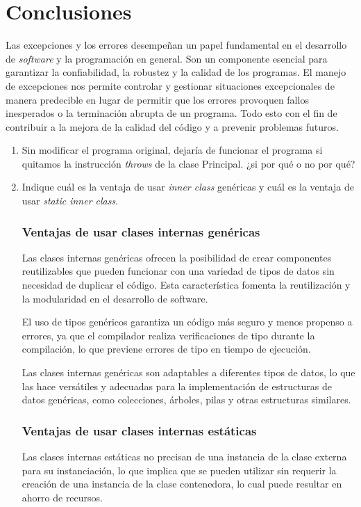 \documentclass[11pt, twocolumn]{article}
\begin{document}
  \section*{Conclusiones}
  Las excepciones y los errores desempeñan un papel fundamental en el desarrollo de \textit{software} y la programación en general. Son un componente esencial para garantizar la confiabilidad, la robustez y la calidad de los programas. El manejo de excepciones nos permite controlar y gestionar situaciones excepcionales de manera predecible en lugar de permitir que los errores provoquen fallos inesperados o la terminación abrupta de un programa. Todo esto con el fin de contribuir a la mejora de la calidad del código y a prevenir problemas futuros.

  \begin{enumerate}
    \item Sin modificar el programa original, dejaría de funcionar el programa si quitamos la instrucción \textit{throws} de la clase Principal. ¿si por qué o no por qué?
    
    

    \item Indique cuál es la ventaja de usar \textit{inner class} genéricas y cuál es la ventaja de usar \textit{static inner class}.
    
    \subsubsection*{Ventajas de usar clases internas genéricas}
    Las clases internas genéricas ofrecen la posibilidad de crear componentes reutilizables que pueden funcionar con una variedad de tipos de datos sin necesidad de duplicar el código. Esta característica fomenta la reutilización y la modularidad en el desarrollo de software.

    El uso de tipos genéricos garantiza un código más seguro y menos propenso a errores, ya que el compilador realiza verificaciones de tipo durante la compilación, lo que previene errores de tipo en tiempo de ejecución.

    Las clases internas genéricas son adaptables a diferentes tipos de datos, lo que las hace versátiles y adecuadas para la implementación de estructuras de datos genéricas, como colecciones, árboles, pilas y otras estructuras similares.

    \subsubsection*{Ventajas de usar clases internas estáticas}
    Las clases internas estáticas no precisan de una instancia de la clase externa para su instanciación, lo que implica que se pueden utilizar sin requerir la creación de una instancia de la clase contenedora, lo cual puede resultar en ahorro de recursos.


\end{enumerate}
\end{document}
